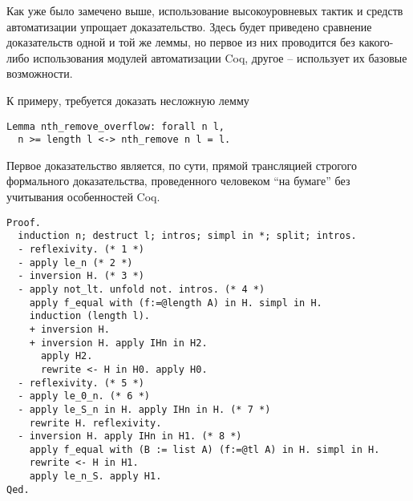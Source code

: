 Как уже было замечено выше, использование высокоуровневых тактик и средств автоматизации упрощает доказательство. Здесь будет приведено сравнение доказательств одной и той же леммы, но первое из них проводится без какого-либо использования модулей автоматизации Coq, другое -- использует их базовые возможности.

К примеру, требуется доказать несложную лемму
\begin{lstlisting}
Lemma nth_remove_overflow: forall n l,
  n >= length l <-> nth_remove n l = l.
\end{lstlisting}

Первое доказательство является, по сути, прямой трансляцией строгого формального доказательства, проведенного человеком ``на бумаге'' без учитывания особенностей Coq.
\begin{lstlisting}
Proof.
  induction n; destruct l; intros; simpl in *; split; intros.
  - reflexivity. (* 1 *)
  - apply le_n (* 2 *)
  - inversion H. (* 3 *)
  - apply not_lt. unfold not. intros. (* 4 *)
    apply f_equal with (f:=@length A) in H. simpl in H.
    induction (length l).
    + inversion H.
    + inversion H. apply IHn in H2.
      apply H2.
      rewrite <- H in H0. apply H0.
  - reflexivity. (* 5 *)
  - apply le_0_n. (* 6 *)
  - apply le_S_n in H. apply IHn in H. (* 7 *)
    rewrite H. reflexivity.
  - inversion H. apply IHn in H1. (* 8 *)
    apply f_equal with (B := list A) (f:=@tl A) in H. simpl in H.
    rewrite <- H in H1.
    apply le_n_S. apply H1.
Qed.
\end{lstlisting}

